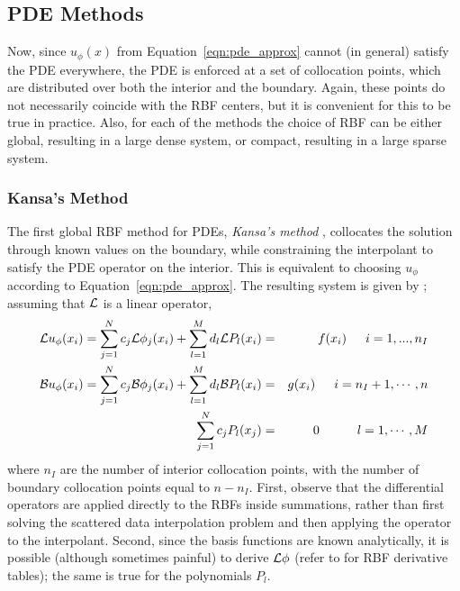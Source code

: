 \documentclass[11pt]{report}
\begin{document}
{ 
\subsection{PDE Methods} 

Now, since $u_{\phi}(x)$ from Equation~\ref{eqn:pde_approx} cannot (in general) satisfy the PDE everywhere, the PDE is enforced at a set of collocation points, which are  distributed over both the interior and the boundary. Again, these points do not necessarily coincide with the RBF centers, but it is convenient for this to be true in practice. Also, for each of the methods the choice of RBF can be either global, resulting in a large dense system, or compact, resulting in a large sparse system. 

\subsubsection{Kansa's Method}

The first global RBF method for PDEs, \emph{Kansa's method} \cite{Kansa1990a, Kansa1990b}, collocates the solution through known values on the boundary, while constraining the interpolant to satisfy the PDE operator on the interior. This is equivalent to choosing $u_\phi$ according to Equation~\ref{eqn:pde_approx}. The resulting system is given by \cite{Mouat2002}; assuming that $\mathcal{L}$ is a linear operator, 
\begin{eqnarray}
\mathcal{L}u_\phi(x_i) = \sum_{j=1}^{N}c_j\mathcal{L}\phi_j(x_i) + \sum_{l=1}^{M}d_l \mathcal{L}P_l(x_i) &=&f(x_i)  \hskip1.5em i = 1,...,n_I  \label{eqn:kansa_interior} \\ 
\mathcal{B}u_\phi(x_i) = \sum_{j=1}^{N}c_j \mathcal{B}\phi_j(x_i) + \sum_{l=1}^{M}d_l \mathcal{B}P_l(x_i) &=& g(x_i)  \hskip1.5em i = n_I + 1, \cdots, n \label{eqn:kansa_boundary} \\
\sum_{j=1}^{N} c_j P_l(x_j) & = & 0 \hskip3.0em l=1,\cdots,M \label{eqn:kansa_constraints} 
\end{eqnarray}
where $n_I$ are the number of interior collocation points, with the number of boundary collocation points equal to $n - n_I$. First, observe that the differential operators are applied directly to the RBFs inside summations, rather than first solving the scattered data interpolation problem and then applying the operator to the interpolant.  Second, since the basis functions are known analytically, it is possible (although sometimes painful) to derive $\mathcal{L}\phi$ (refer to \cite{Fasshauer2007} for RBF derivative tables); the same is true for the polynomials $P_l$. 

}
\end{document}
